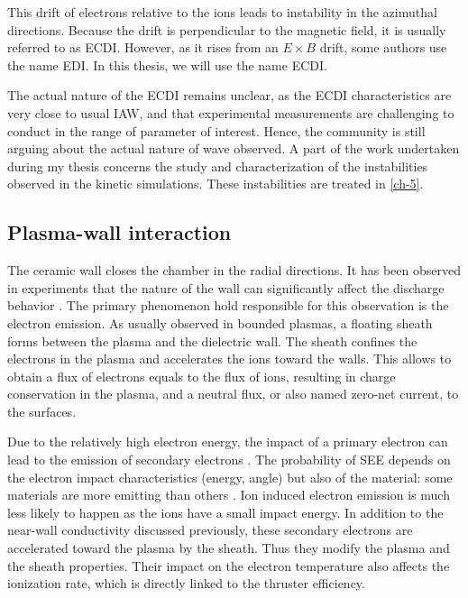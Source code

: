   This drift of electrons relative to the ions leads to instability in the azimuthal directions.
  Because the drift is perpendicular to the magnetic field, it is usually referred to as \ac{ECDI}.
  However, as it rises from an $E\times B$ drift, some authors use the name \ac{EDI}.
  In this thesis, we will use the name \ac{ECDI}.

  The actual nature of the \ac{ECDI} remains unclear\citep{boeuf2018}, as the \ac{ECDI} characteristics are very close to usual \ac{IAW}, and that experimental measurements are challenging to conduct in the range of parameter of interest.
  Hence, the community is still arguing about the actual nature of wave observed.
  A part of the work undertaken during my thesis concerns the study and characterization of the instabilities observed in the kinetic simulations.
  These instabilities are treated in \cref{ch-5}.
  
\subsection*{Plasma-wall interaction}

  The ceramic wall closes the chamber in the radial directions.
  It has been observed in experiments that the nature of the wall can significantly affect the discharge behavior \citep{gascon2003}.
  The primary phenomenon hold responsible for this observation is the electron emission.
  As usually observed in bounded plasmas, a floating sheath forms between the plasma and the dielectric wall.
  The sheath confines the electrons in the plasma and accelerates the ions toward the walls.
  This allows to obtain a flux of electrons equals to the flux of ions, resulting in charge conservation in the plasma, and a neutral flux, or also named zero-net current, to the surfaces.
  
  Due to the relatively high electron energy, the impact of a primary electron can lead to the emission of secondary electrons \citep{barral2003a,villemant2018}.
  The probability of \ac{SEE} depends on the electron impact characteristics (energy, angle) but also of the material\string: some materials are more emitting than others \citep{gascon2003}.
  Ion induced electron emission is much less likely to happen as the ions have a small impact energy.
  In addition to the near-wall conductivity discussed previously, these secondary electrons are accelerated toward the plasma by the sheath.
  Thus they modify the plasma and the sheath properties.
  Their impact on the electron temperature also affects the ionization rate, which is directly linked to the thruster efficiency.
  
